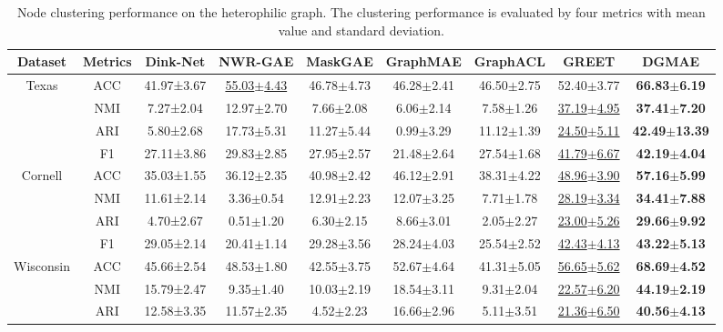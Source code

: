 \documentclass[sigconf]{acmart}
\begin{document}
\begin{table}[ht]
    \centering
     \caption{Node clustering performance on the heterophilic graph. The clustering performance is evaluated by four metrics with mean value and standard deviation. }
   \begin{tabular}{c|c|ccccccc}
        \toprule
          Dataset & Metrics &Dink-Net & NWR-GAE & MaskGAE & GraphMAE&GraphACL & GREET&\textbf{DGMAE} \\
        \midrule
        \multirow{4}{*}{Texas}
        &ACC & 41.97±3.67 &\underline{55.03$\pm$4.43} &46.78$\pm$4.73&46.28$\pm$2.41 &46.50$\pm$2.75 & 52.40$\pm$3.77&\textbf{66.83$\pm$6.19}\\
        &NMI & 7.27±2.04 & 12.97$\pm$2.70& 7.66$\pm$2.08&6.06$\pm$2.14 &7.58$\pm$1.26&\underline{37.19$\pm$4.95}&\textbf{37.41$\pm$7.20}\\
        & ARI & 5.80±2.68 & 17.73$\pm$5.31 &11.27$\pm$5.44& 0.99$\pm$3.29  & 11.12$\pm$1.39&\underline{24.50$\pm$5.11} & \textbf{42.49$\pm$13.39}  \\
        &F1 &  27.11±3.86 & 29.83$\pm$2.85 & 27.95$\pm$2.57 & 21.48$\pm$2.64 & 27.54$\pm$1.68&\underline{41.79$\pm$6.67} & \textbf{42.19$\pm$4.04} \\
        \midrule
        \multirow{4}{*}{Cornell}
        &ACC& 35.03±1.55 &36.12$\pm$2.35 & 40.98$\pm$2.42&46.12$\pm$2.91 &38.31$\pm$4.22&\underline{48.96$\pm$3.90}&\textbf{57.16$\pm$5.99}\\
        &NMI & 11.61±2.14 &3.36$\pm$0.54 & 12.91$\pm$2.23&12.07$\pm$3.25 &7.71$\pm$1.78&\underline{28.19$\pm$3.34}&\textbf{34.41$\pm$7.88}\\
        & ARI& 4.70±2.67 & 0.51$\pm$1.20 & 6.30$\pm$2.15& 8.66$\pm$3.01  &2.05$\pm$2.27&\underline{23.00$\pm$5.26}& \textbf{29.66$\pm$9.92} \\
        &F1 & 29.05±2.14 & 20.41$\pm$1.14 & 29.28$\pm$3.56& 28.24$\pm$4.03 & 25.54$\pm$2.52&\underline{42.43$\pm$4.13} & \textbf{43.22$\pm$5.13}  \\
        \midrule        
        \multirow{4}{*}{Wisconsin}
        &ACC & 45.66±2.54 &48.53$\pm$1.80 & 42.55$\pm$3.75&52.67$\pm$4.64 &41.31$\pm$5.05&\underline{56.65$\pm$5.62} &\textbf{68.69$\pm$4.52}\\
        &NMI & 15.79±2.47 &9.35$\pm$1.40 & 10.03$\pm$2.19&18.54$\pm$3.11 &9.31$\pm$2.04& \underline{22.57$\pm$6.20} &\textbf{44.19$\pm$2.19}\\
        & ARI & 12.58±3.35 & 11.57$\pm$2.35 & 4.52$\pm$2.23 & 16.66$\pm$2.96  & 5.11$\pm$3.51&\underline{21.36$\pm$6.50} & \textbf{40.56$\pm$4.13} \\

\end{tabular}
\end{table}
\end{document}

